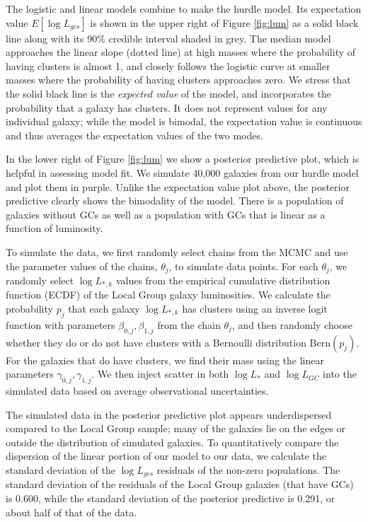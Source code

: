 \documentclass[twocolumn]{aastex631}
\begin{document}
The logistic and linear models combine to make the hurdle model. Its expectation value $E[\log{L_{gcs}}]$ is shown in the upper right of Figure \ref{fig:lum} as a solid black line along with its 90\% credible interval shaded in grey. The median model approaches the linear slope (dotted line) at high masses where the probability of having clusters is almost 1, and closely follows the logistic curve at smaller masses where the probability of having clusters approaches zero. We stress that the solid black line is the \textit{expected value} of the model, and incorporates the probability that a galaxy has clusters. It does not represent values for any individual galaxy; while the model is bimodal, the expectation value is continuous and thus averages the expectation values of the two modes. 

In the lower right of Figure \ref{fig:lum} we show a posterior predictive plot, which is helpful in assessing model fit. We simulate 40,000 galaxies from our hurdle model and plot them in purple. Unlike the expectation value plot above, the posterior predictive clearly shows the bimodality of the model. There is a population of galaxies without GCs as well as a population with GCs that is linear as a function of luminosity. 

To simulate the data, we first randomly select chains from the MCMC and use the parameter values of the chains, $\theta_j$, to simulate data points. For each $\theta_j$, we randomly select $\log{L_{*,k}}$ values from the empirical cumulative distribution function (ECDF) of the Local Group galaxy luminosities. We calculate the probability $p_j$ that each galaxy $\log{L_{*,k}}$ has clusters using an inverse logit function with parameters $\beta_{0,j}, \beta_{1,j}$ from the chain $\theta_j$, and then randomly choose whether they do or do not have clusters with a Bernoulli distribution $\mathrm{Bern}(p_j)$. For the galaxies that do have clusters, we find their mass using the linear parameters $\gamma_{0,j}, \gamma_{1,j}$. We then inject scatter in both $\log{L_*}$ and $\log{L_{GC}}$ into the simulated data based on average observational uncertainties.

The simulated data in the posterior predictive plot appears underdispersed compared to the Local Group sample; many of the galaxies lie on the edges or outside the distribution of simulated galaxies. To quantitatively compare the dispersion of the linear portion of our model to our data, we calculate the standard deviation of the $\log{L_{gcs}}$ residuals of the non-zero populations. The standard deviation of the residuals of the Local Group galaxies (that have GCs) is 0.600, while the standard deviation of the posterior predictive is 0.291, or about half of that of the data.
\end{document}
